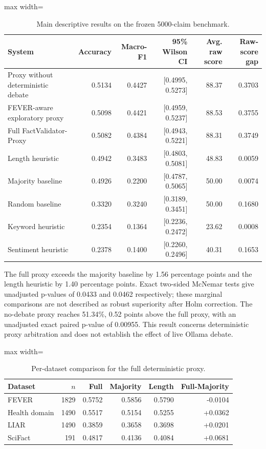 \documentclass[conference]{IEEEtran}
\begin{document}
\begin{table}[htbp]
\centering
\caption{Main descriptive results on the frozen 5000-claim benchmark.}
\label{tab:main}
\footnotesize
\setlength{\tabcolsep}{3pt}
\begin{adjustbox}{max width=\columnwidth}
\begin{tabular}{lrrrrr}
\toprule
System & Accuracy & Macro-F1 & 95\% Wilson CI & Avg. raw score & Raw-score gap \\
\midrule
Proxy without deterministic debate & 0.5134 & 0.4427 & [0.4995, 0.5273] & 88.37 & 0.3703 \\
FEVER-aware exploratory proxy & 0.5098 & 0.4421 & [0.4959, 0.5237] & 88.53 & 0.3755 \\
Full FactValidator-Proxy & 0.5082 & 0.4384 & [0.4943, 0.5221] & 88.31 & 0.3749 \\
Length heuristic & 0.4942 & 0.3483 & [0.4803, 0.5081] & 48.83 & 0.0059 \\
Majority baseline & 0.4926 & 0.2200 & [0.4787, 0.5065] & 50.00 & 0.0074 \\
Random baseline & 0.3320 & 0.3240 & [0.3189, 0.3451] & 50.00 & 0.1680 \\
Keyword heuristic & 0.2354 & 0.1364 & [0.2236, 0.2472] & 23.62 & 0.0008 \\
Sentiment heuristic & 0.2378 & 0.1400 & [0.2260, 0.2496] & 40.31 & 0.1653 \\
\bottomrule
\end{tabular}
\end{adjustbox}
\end{table}

The full proxy exceeds the majority baseline by 1.56 percentage points and the length heuristic by 1.40 percentage points. Exact two-sided McNemar tests give unadjusted p-values of 0.0433 and 0.0462 respectively; these marginal comparisons are not described as robust superiority after Holm correction. The no-debate proxy reaches 51.34\%, 0.52 points above the full proxy, with an unadjusted exact paired p-value of 0.00955. This result concerns deterministic proxy arbitration and does not establish the effect of live Ollama debate.

\begin{table}[htbp]
\centering
\caption{Per-dataset comparison for the full deterministic proxy.}
\label{tab:dataset}
\footnotesize
\setlength{\tabcolsep}{4pt}
\begin{adjustbox}{max width=\columnwidth}
\begin{tabular}{lrrrrr}
\toprule
Dataset & $n$ & Full & Majority & Length & Full-Majority \\
\midrule
FEVER & 1829 & 0.5752 & 0.5856 & 0.5790 & -0.0104 \\
Health domain & 1490 & 0.5517 & 0.5154 & 0.5255 & +0.0362 \\
LIAR & 1490 & 0.3859 & 0.3658 & 0.3698 & +0.0201 \\
SciFact & 191 & 0.4817 & 0.4136 & 0.4084 & +0.0681 \\
\bottomrule
\end{tabular}
\end{adjustbox}
\end{table}
\end{document}
